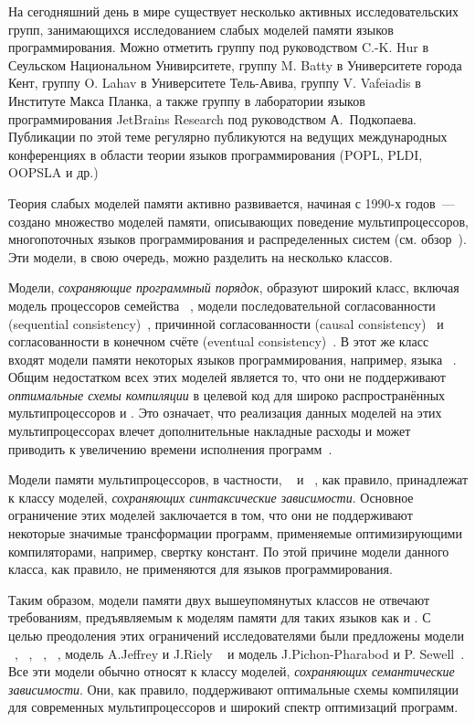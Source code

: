 {\progress}

На сегодняшний день в мире существует несколько активных исследовательских групп, 
занимающихся исследованием слабых моделей памяти языков программирования.
Можно отметить
группу под руководством C.-K. Hur в Сеульском Национальном Унивирситете,
группу M. Batty в Университете города Кент,
группу O. Lahav в Университете Тель-Авива,
группу V. Vafeiadis в Институте Макса Планка,
а также группу в лаборатории языков программирования JetBrains Research
под руководством А.~Подкопаева. 
Публикации по этой теме регулярно публикуются на ведущих
международных конференциях в области теории языков программирования 
(POPL, PLDI, OOPSLA и др.)

Теория слабых моделей памяти активно развивается, 
начиная с 1990-х годов~--- создано множество моделей памяти, 
описывающих поведение мультипроцессоров, 
многопоточных языков программирования и распределенных систем 
(см. обзор~\cite{Moiseenko-al:PCS21}). 
Эти модели, в свою очередь, можно разделить на несколько классов.

Модели, \emph{сохраняющие программный порядок}, образуют широкий класс,
включая модель \TSO процессоров семейства \Intel~\autocite{Sewell-al:CACM10},
модели последовательной согласованности (sequential consistency)~\autocite{Lamport:TC79},
причинной согласованности (causal consistency)~\autocite{Lahav-Boker:PLDI2020}
и согласованности в конечном счёте (eventual consistency)~\autocite{Jagadeesan-al:ESOP2018}. 
В этот же класс входят  модели памяти некоторых языков программирования, например,
языка \OCaml~\autocite{Dolan-al:PLDI18}.
Общим недостатком всех этих моделей является то,
что они не поддерживают \emph{оптимальные схемы компиляции} 
в целевой код для широко распространённых мультипроцессоров \ARM и \POWER.
Это означает, что реализация данных моделей на этих мультипроцессорах
влечет дополнительные накладные расходы и может приводить
к увеличению времени исполнения программ~\autocite{Ou-Demsky:OOPSLA18}. 

Модели памяти мультипроцессоров,
в частности, \ARM~\autocite{Pulte-al:POPL18} и \POWER~\autocite{Sarkar-al:PLDI11}, 
как правило, принадлежат к классу моделей, \emph{сохраняющих синтаксические зависимости}. 
Основное ограничение этих моделей заключается в том, 
что они не поддерживают некоторые значимые трансформации программ, 
применяемые оптимизирующими компиляторами, например, свертку констант.
По этой причине модели данного класса, как правило,
не применяются для языков программирования.  

Таким образом, модели памяти двух вышеупомянутых классов 
не отвечают требованиям, предъявляемым к моделям памяти для таких языков как \CPP и \Java. 
С целью преодоления этих ограничений исследователями были предложены модели  
\Prm~\autocite{Kang-al:POPL17}, \Wkm~\autocite{Chakraborty-Vafeiadis:POPL19}, 
\MRD~\autocite{Paviotti-al:ESOP20}, \PwP~\autocite{Jagadeesan-al:OOPSLA2020},
модель A.Jeffrey и J.Riely ~\autocite{Jeffrey-Riely:LICS16} и
модель J.Pichon-Pharabod и P. Sewell~\autocite{PichonPharabod-Sewell:POPL16}.
Все эти модели обычно относят к классу моделей, \emph{сохраняющих семантические зависимости}.
Они, как правило, поддерживают оптимальные схемы компиляции
для современных мультипроцессоров и широкий спектр оптимизаций программ.

